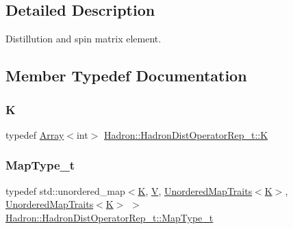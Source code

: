 \subsection{Detailed Description}
Distillution and spin matrix element. 

\subsection{Member Typedef Documentation}
\mbox{\label{classHadron_1_1HadronDistOperatorRep__t_a670c7409bfd80616aeb0159590bcdb6b}} 
\subsubsection{\texorpdfstring{K}{K}}
{\footnotesize\ttfamily typedef \mbox{\hyperlink{classXMLArray_1_1Array}{Array}}$<$int$>$ \mbox{\hyperlink{classHadron_1_1HadronDistOperatorRep__t_a670c7409bfd80616aeb0159590bcdb6b}{Hadron\+::\+Hadron\+Dist\+Operator\+Rep\+\_\+t\+::K}}}

\mbox{\label{classHadron_1_1HadronDistOperatorRep__t_a28874b1705be0d32099d426de9fb44c0}} 
\subsubsection{\texorpdfstring{MapType\_t}{MapType\_t}}
{\footnotesize\ttfamily typedef std\+::unordered\+\_\+map$<$\mbox{\hyperlink{classHadron_1_1HadronDistOperatorRep__t_a670c7409bfd80616aeb0159590bcdb6b}{K}}, \mbox{\hyperlink{classHadron_1_1HadronDistOperatorRep__t_a40f37383ae57b1d0bbf944d698a10382}{V}}, \mbox{\hyperlink{structADAT_1_1UnorderedMapTraits}{Unordered\+Map\+Traits}}$<$\mbox{\hyperlink{classHadron_1_1HadronDistOperatorRep__t_a670c7409bfd80616aeb0159590bcdb6b}{K}}$>$, \mbox{\hyperlink{structADAT_1_1UnorderedMapTraits}{Unordered\+Map\+Traits}}$<$\mbox{\hyperlink{classHadron_1_1HadronDistOperatorRep__t_a670c7409bfd80616aeb0159590bcdb6b}{K}}$>$ $>$ \mbox{\hyperlink{classHadron_1_1HadronDistOperatorRep__t_a28874b1705be0d32099d426de9fb44c0}{Hadron\+::\+Hadron\+Dist\+Operator\+Rep\+\_\+t\+::\+Map\+Type\+\_\+t}}}

